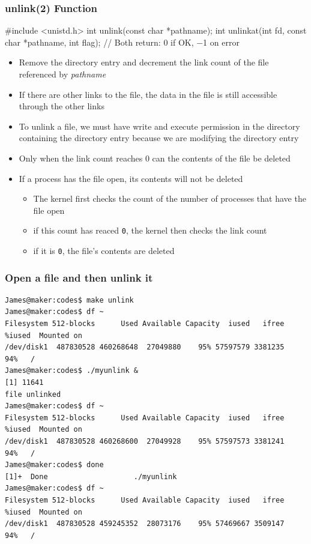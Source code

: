 \documentclass[newPxFont,sthlmFooter,nooffset]{beamer}
\begin{document}
\begin{frame}[containsverbatim,t]
  \frametitle{unlink(2) Function}
\begin{codedef}
#include <unistd.h>
int unlink(const char *pathname);
int unlinkat(int fd, const char *pathname, int flag);
// Both return: 0 if OK, −1 on error
\end{codedef}

{\footnotesize
\begin{itemize}
\item Remove the directory entry and decrement the link count of the file referenced by \textit{pathname}
\item If there are other links to the file, the data in the file is still accessible through the other links
\item To unlink a file, we must have write  and execute permission in the directory containing the directory entry because we are modifying the directory entry
\item Only when the link count reaches 0 can the contents of the file be deleted
\item If a process has the file open, its contents will not be deleted
  \begin{itemize}
  \item The kernel first checks the count of the number of processes that have the file open
  \item if this count has reaced \texttt{0}, the kernel then checks the link count
  \item if it is \texttt{0}, the file's contents are deleted
  \end{itemize}
\end{itemize}
}
\end{frame}

\begin{frame}[fragile]
  \frametitle{Open a file and then unlink it}
{\footnotesize
\begin{verbatim}
James@maker:codes$ make unlink
James@maker:codes$ df ~
Filesystem 512-blocks      Used Available Capacity  iused   ifree %iused  Mounted on
/dev/disk1  487830528 460268648  27049880    95% 57597579 3381235   94%   /
James@maker:codes$ ./myunlink &
[1] 11641
file unlinked
James@maker:codes$ df ~
Filesystem 512-blocks      Used Available Capacity  iused   ifree %iused  Mounted on
/dev/disk1  487830528 460268600  27049928    95% 57597573 3381241   94%   /
James@maker:codes$ done
[1]+  Done                    ./myunlink
James@maker:codes$ df ~
Filesystem 512-blocks      Used Available Capacity  iused   ifree %iused  Mounted on
/dev/disk1  487830528 459245352  28073176    95% 57469667 3509147   94%   /
\end{verbatim}
}
\end{frame}
\end{document}
